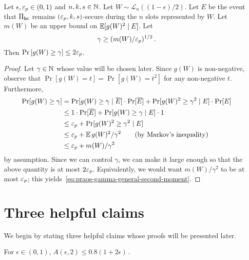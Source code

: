 \begin{lemma}\label{lemma:praos-tail-gamma}
  Let $\epsilon, \mathsf{\varepsilon}_p \in (0, 1)$ and $n, k, s \in \mathbb{N}$. 
  Let $W \sim \mathcal{L}_n((1-\epsilon)/2)$.
  Let $E$ be the event that 
  $\Pi_\mathsf{bc}$ remains $(\mathsf{\varepsilon}_p, k, s)$-secure during 
  the $n$ slots represented by $W$. 
  Let $m(W)$ be an upper bound on $\operatorname{\mathbb{E}}[ g(W)^2 \mid E]$.
  Let 
  \begin{equation}\label{eq:praos-gamma-general-second-moment}
    \gamma \geq (m(W)/\mathsf{\varepsilon}_p)^{1/2}
    \,.
  \end{equation}
  Then 
  $
      \Pr\left[g(W) \geq \gamma\right] \leq 2 \mathsf{\varepsilon}_p
  $.
\end{lemma}
\begin{proof}
  Let $\gamma \in \mathbb{N}$ whose value will be chosen later. 
  Since $g(W)$ is non-negative, observe that 
  $\Pr[g(W) = t] = \Pr[g(W) = t^2]$ for any non-negative $t$. 
  Furthermore, 
  \begin{align*}
    \Pr[g(W) \geq \gamma]
    &= \Pr[g(W) \geq \gamma \mid \overline{E}] \cdot \Pr[\overline{E}] 
      + \Pr[g(W)^2 \geq \gamma^2 \mid E] \cdot \Pr[E]\\
    &\leq 1 \cdot \Pr[\overline{E}] + \Pr[g(W) \geq \gamma \mid E] \cdot 1 \\
    &\leq \mathsf{\varepsilon}_p + \Pr[g(W)^2 \geq \gamma^2 \mid E] \\
    &\leq \mathsf{\varepsilon}_p + \operatorname{\mathbb{E}} g(W)^2/\gamma^2 \qquad \text{(by Markov's inequality)} \\
    &\leq \mathsf{\varepsilon}_p + m(W)/\gamma^2 
  \end{align*}
  by assumption. Since we can control $\gamma$,
  we can make it large enough so that the above quantity is at most $2 \mathsf{\varepsilon}_p$. 
  Equivalently, we would want 
  $m(W)/\gamma^2$ to be at most $\mathsf{\varepsilon}_p$; 
  this yields~\eqref{eq:praos-gamma-general-second-moment}.
\end{proof}





\section{Three helpful claims}
We begin by stating three helpful claims 
whose proofs will be presented later.

\begin{claim}\label{claim:multiple-honest-blocks}
  For $\epsilon \in (0, 1)$, 
  $
    A(\epsilon, 2) 
    \leq 0.8 (1 + 2 \epsilon)
    \,.
  $
\end{claim}


